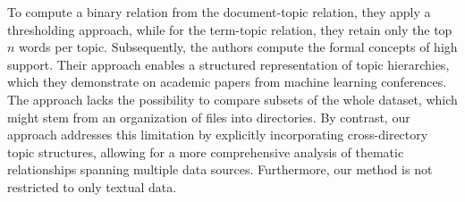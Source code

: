 To compute a binary relation from the document-topic relation, they apply a thresholding approach,
while for the term-topic relation, they retain only the top $n$ words per topic.
Subsequently, the authors compute the formal concepts of high support.
Their approach enables a structured representation of topic hierarchies,
which they demonstrate on academic papers from machine learning conferences.
The approach lacks the possibility to compare subsets of the whole dataset, which might stem from an organization of files into directories.
By contrast, our approach addresses this limitation by explicitly incorporating cross-directory topic structures,
allowing for a more comprehensive analysis of thematic relationships spanning multiple data sources.
Furthermore, our method is not restricted to only textual data.

